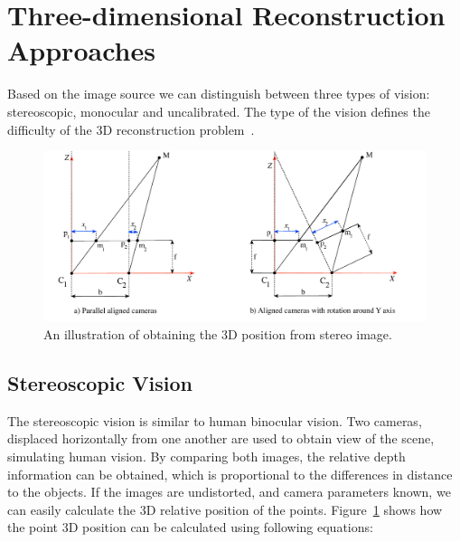 \section{Three-dimensional Reconstruction Approaches}
Based on the image source we can distinguish between three types of vision: stereoscopic, monocular and uncalibrated. The type of the vision defines the difficulty of the 3D reconstruction problem~\cite{book:multiple_view_geometry}.

\begin{figure}[ht]
	\begin{center}
		\includegraphics[keepaspectratio,width=\textwidth]{fig/stereo.pdf}
	\end{center}
	\caption{An illustration of obtaining the 3D position from stereo image.}
	\label{fig:stereo}
\end{figure}

\subsection*{Stereoscopic Vision}
The stereoscopic vision is similar to human binocular vision. Two cameras, displaced horizontally from one another are used to obtain view of the scene, simulating human vision. By comparing both images, the relative depth information can be obtained, which is proportional to the differences in distance to the objects. If the images are undistorted, and camera parameters known, we can easily calculate the 3D relative position of the points. Figure~\ref{fig:stereo} shows how the point 3D position can be calculated using following equations:

